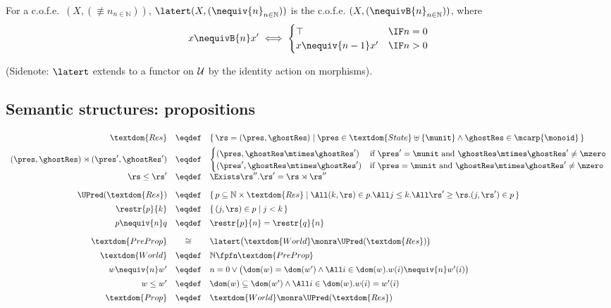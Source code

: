 For a c.o.f.e.\ $(X,(\nequiv{n}_{n\in\mathbb{N}}))$, 
$\latert (X,(\nequiv{n}_{n\in\mathbb{N}}))$ is the c.o.f.e.\@
$(X,(\nequivB{n}_{n\in\mathbb{N}}))$,  where
\[
x \nequivB{n} x' \iff \begin{cases}
\top	&\IF n=0 \\
x \nequiv{n-1} x' &\IF n>0
\end{cases}
\]

(Sidenote: $\latert$ extends to a functor on $\cal U$ by the identity
action on morphisms).


\subsection{Semantic structures: propositions}

\[
\begin{array}[t]{rcl}
\textdom{Res} &\eqdef&
\{\, \rs = (\pres, \ghostRes) \mid
\pres \in \textdom{State} \uplus \{\munit\} \land \ghostRes \in \mcarp{\monoid} \,\} \\[0.5em]
(\pres, \ghostRes) \rtimes
(\pres', \ghostRes') &\eqdef&
\begin{cases}
(\pres, \ghostRes \mtimes \ghostRes')  & \mbox{if $\pres' = \munit$ and $\ghostRes \mtimes \ghostRes' \neq \mzero$} \\
(\pres', \ghostRes \mtimes \ghostRes') & \mbox{if $\pres = \munit$ and $\ghostRes \mtimes \ghostRes' \neq \mzero$}
\end{cases}
\\[0.5em]
%
\rs \leq \rs' & \eqdef &
\Exists \rs''. \rs' = \rs \rtimes \rs''\\[1em]
%
\UPred(\textdom{Res}) &\eqdef& 
\{\, p \subseteq \mathbb{N} \times \textdom{Res} \mid
\All (k,\rs) \in p.
\All j\leq k.
\All \rs' \geq \rs.
(j,\rs')\in p \,\}\\[0.5em]
\restr{p}{k} &\eqdef& 
\{\, (j, \rs) \in p \mid j < k \,\}\\[0.5em]
p \nequiv{n} q & \eqdef & \restr{p}{n} = \restr{q}{n}\\[1em]
%
\textdom{PreProp} & \cong  &
\latert\big( \textdom{World} \monra \UPred(\textdom{Res})
\big)\\[0.5em]
%
\textdom{World} & \eqdef &
\mathbb{N} \fpfn \textdom{PreProp}\\[0.5em]
%
w \nequiv{n} w' & \eqdef & 
n = 0 \lor
\bigl(\dom(w) = \dom(w') \land \All i\in\dom(w). w(i) \nequiv{n} w'(i)\bigr)
\\[0.5em]
%
w \leq w' & \eqdef & 
\dom(w) \subseteq \dom(w') \land \All i \in \dom(w). w(i) = w'(i) 
\\[0.5em]
%
\textdom{Prop} & \eqdef & \textdom{World} \monra \UPred(\textdom{Res})
\end{array}
\]

